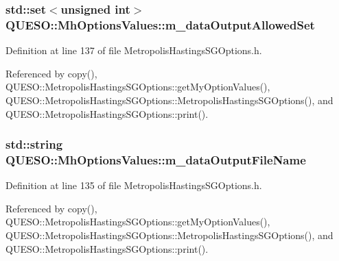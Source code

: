 \hypertarget{class_q_u_e_s_o_1_1_mh_options_values_ac3c9acb7a09d53c2ae4bd9088e99aa27}{
\subsubsection[{m\-\_\-data\-Output\-Allowed\-Set}]{\setlength{\rightskip}{0pt plus 5cm}std\-::set$<$unsigned int$>$ Q\-U\-E\-S\-O\-::\-Mh\-Options\-Values\-::m\-\_\-data\-Output\-Allowed\-Set}}\label{class_q_u_e_s_o_1_1_mh_options_values_ac3c9acb7a09d53c2ae4bd9088e99aa27}


Definition at line 137 of file Metropolis\-Hastings\-S\-G\-Options.\-h.



Referenced by copy(), Q\-U\-E\-S\-O\-::\-Metropolis\-Hastings\-S\-G\-Options\-::get\-My\-Option\-Values(), Q\-U\-E\-S\-O\-::\-Metropolis\-Hastings\-S\-G\-Options\-::\-Metropolis\-Hastings\-S\-G\-Options(), and Q\-U\-E\-S\-O\-::\-Metropolis\-Hastings\-S\-G\-Options\-::print().

\hypertarget{class_q_u_e_s_o_1_1_mh_options_values_a768664ee23ad3783751eca33eaeb14b9}{
\subsubsection[{m\-\_\-data\-Output\-File\-Name}]{\setlength{\rightskip}{0pt plus 5cm}std\-::string Q\-U\-E\-S\-O\-::\-Mh\-Options\-Values\-::m\-\_\-data\-Output\-File\-Name}}\label{class_q_u_e_s_o_1_1_mh_options_values_a768664ee23ad3783751eca33eaeb14b9}


Definition at line 135 of file Metropolis\-Hastings\-S\-G\-Options.\-h.



Referenced by copy(), Q\-U\-E\-S\-O\-::\-Metropolis\-Hastings\-S\-G\-Options\-::get\-My\-Option\-Values(), Q\-U\-E\-S\-O\-::\-Metropolis\-Hastings\-S\-G\-Options\-::\-Metropolis\-Hastings\-S\-G\-Options(), and Q\-U\-E\-S\-O\-::\-Metropolis\-Hastings\-S\-G\-Options\-::print().

